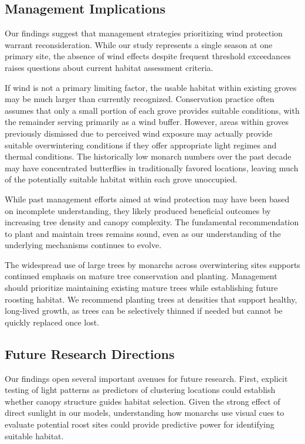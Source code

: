 \subsection{Management Implications}

Our findings suggest that management strategies prioritizing wind protection warrant reconsideration. While our study represents a single season at one primary site, the absence of wind effects despite frequent threshold exceedances raises questions about current habitat assessment criteria.

If wind is not a primary limiting factor, the usable habitat within existing groves may be much larger than currently recognized. Conservation practice often assumes that only a small portion of each grove provides suitable conditions, with the remainder serving primarily as a wind buffer. However, areas within groves previously dismissed due to perceived wind exposure may actually provide suitable overwintering conditions if they offer appropriate light regimes and thermal conditions. The historically low monarch numbers over the past decade may have concentrated butterflies in traditionally favored locations, leaving much of the potentially suitable habitat within each grove unoccupied.

While past management efforts aimed at wind protection may have been based on incomplete understanding, they likely produced beneficial outcomes by increasing tree density and canopy complexity. The fundamental recommendation to plant and maintain trees remains sound, even as our understanding of the underlying mechanisms continues to evolve.

The widespread use of large trees by monarchs across overwintering sites supports continued emphasis on mature tree conservation and planting. Management should prioritize maintaining existing mature trees while establishing future roosting habitat. We recommend planting trees at densities that support healthy, long-lived growth, as trees can be selectively thinned if needed but cannot be quickly replaced once lost.

\subsection{Future Research Directions}

Our findings open several important avenues for future research. First, explicit testing of light patterns as predictors of clustering locations could establish whether canopy structure guides habitat selection. Given the strong effect of direct sunlight in our models, understanding how monarchs use visual cues to evaluate potential roost sites could provide predictive power for identifying suitable habitat.


